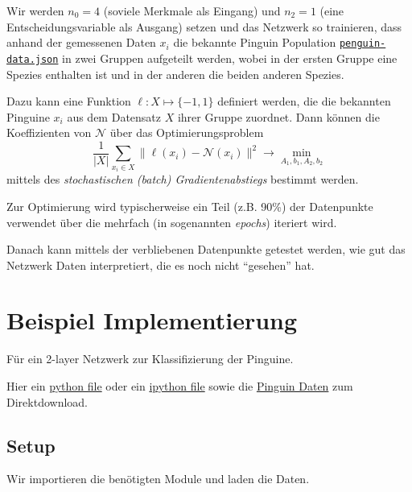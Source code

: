 \documentclass[
]{book}
\theoremstyle{definition}
\theoremstyle{definition}
\theoremstyle{definition}
\theoremstyle{definition}
\theoremstyle{remark}
\begin{document}
Wir werden \(n_0=4\) (soviele Merkmale als Eingang) und \(n_2=1\) (eine
Entscheidungsvariable als Ausgang) setzen und das Netzwerk so trainieren, dass
anhand der gemessenen Daten \(x_i\) die bekannte Pinguin Population
\href{files/penguin-data.json}{\texttt{penguin-data.json}} in zwei Gruppen aufgeteilt
werden, wobei in der ersten Gruppe eine Spezies enthalten ist und in der anderen
die beiden anderen Spezies.

Dazu kann eine Funktion \(\ell \colon X \mapsto \{-1, 1\}\) definiert werden, die die bekannten Pinguine \(x_i\) aus dem Datensatz \(X\) ihrer Gruppe zuordnet. Dann können die Koeffizienten von \(\mathcal N\) über das Optimierungsproblem
\begin{equation*}
\frac{1}{|X|}\sum_{x_i \in X} \|\ell(x_i)-\mathcal N(x_i)\|^2 \to \min_{A_1, b_1, A_2, b_2}
\end{equation*}
mittels des \emph{stochastischen (batch) Gradientenabstiegs} bestimmt werden.

Zur Optimierung wird typischerweise ein Teil (z.B. 90\%) der Datenpunkte
verwendet über die mehrfach (in sogenannten \emph{epochs}) iteriert wird.

Danach kann mittels der verbliebenen Datenpunkte getestet werden, wie gut das
Netzwerk Daten interpretiert, die es noch nicht ``gesehen'' hat.

\hypertarget{beispiel-implementierung}{%
\section{Beispiel Implementierung}\label{beispiel-implementierung}}

Für ein 2-layer Netzwerk zur Klassifizierung der Pinguine.

Hier ein \href{files/051_sngltarg.py}{python file} oder ein \href{files/051_sngltarg.ipynb}{ipython
file} sowie die \href{files/penguin-data.json}{Pinguin
Daten} zum Direktdownload.

\hypertarget{setup}{%
\subsection{Setup}\label{setup}}

Wir importieren die benötigten Module und laden die Daten.
\end{document}
